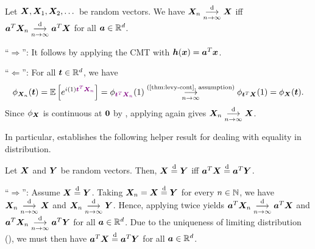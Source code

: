 \begin{enumerate}
\begin{theorem}
\label{thm:cramer-wold}
Let \(\bm{X},\bm{X}_1,\bm{X}_2,\dotsc\) be random vectors. We have
\(\bm{X}_n\underset{n\to\infty}{\overset{\text{d}}{\longrightarrow}}\bm{X}\) iff
\(\bm{a}^{T}\bm{X}_n\underset{n\to\infty}{\overset{\text{d}}{\longrightarrow}}\bm{a}^{T}\bm{X}\) for all
\(\bm{a}\in\mathbb{R}^{d}\).
\end{theorem}
\begin{pf}
``\(\Rightarrow\)'': It follows by applying the CMT with \(\bm{h}(\bm{x})=\bm{a}^{T}\bm{x}\).

``\(\Leftarrow\)'': For all \(\bm{t}\in\mathbb{R}^{d}\), we have
\[
\phi_{\vect{X}_n}(\vect{t})=\expv{e^{i(1)\vc{\vect{t}^{T}\vect{X}_n}}}
=\phi_{\vc{\vect{t}^{T}\vect{X}_n}}(1)
\tox{n}{\text{(\Cref{thm:levy-cont}, assumption)}}
\phi_{\vect{t}^{T}\vect{X}}(1)=\phi_{\vect{X}}(\vect{t}).
\]
Since \(\phi_{\bm{X}}\) is continuous at \(\bm{0}\) by
, applying  again gives
\(\bm{X}_n\underset{n\to\infty}{\overset{\text{d}}{\longrightarrow}} \bm{X}\).
\end{pf}

In particular,  establishes the following helper result
for dealing with equality in distribution.
\begin{corollary}
\label{cor:equal-in-dist-lin-comb}
Let \(\bm{X}\) and \(\bm{Y}\) be random vectors. Then, \(\bm{X}\overset{\text{d}}=
\bm{Y}\) iff \(\bm{a}^{T}\bm{X}\overset{\text{d}}= \bm{a}^{T}\bm{Y}\).
\end{corollary}
\begin{pf}
``\(\Rightarrow\)'': Assume \(\bm{X}\overset{\text{d}}=\bm{Y}\). Taking
\(\bm{X}_n=\bm{X}\overset{\text{d}}= \bm{Y}\) for every \(n\in\mathbb{N}\), we have
\(\bm{X}_n\underset{n\to\infty}{\overset{\text{d}}{\longrightarrow}}\bm{X}\) and \(\bm{X}_n\underset{n\to\infty}{\overset{\text{d}}{\longrightarrow}}\bm{Y}\). Hence,
applying  twice yields \(\bm{a}^{T}\bm{X}_n\underset{n\to\infty}{\overset{\text{d}}{\longrightarrow}}
\bm{a}^{T}\bm{X}\) and \(\bm{a}^{T}\bm{X}_n\underset{n\to\infty}{\overset{\text{d}}{\longrightarrow}}\bm{a}^{T}\bm{Y}\)
for all \(\bm{a}\in\mathbb{R}^{d}\). Due to the uniqueness of limiting
distribution (), we must then have
\(\bm{a}^{T}\bm{X}\overset{\text{d}}= \bm{a}^{T}\bm{Y}\) for all \(\bm{a}\in\mathbb{R}^{d}\).


\end{pf}
\end{enumerate}
